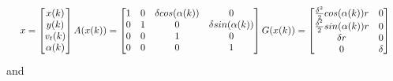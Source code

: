 \documentclass[twocolumn]{article}
\begin{document}
\begin{equation*}
    \resizebox{.99\columnwidth}{!}{ $ x=\begin{bmatrix} x(k) \\ y(k) \\ v_{t}(k) \\ \alpha(k) \\ \end{bmatrix}
            A(x(k))=\begin{bmatrix}
                1 & 0 & \delta cos(\alpha (k)) & 0                            \\
                0 & 1 & 0                            & \delta sin(\alpha (k)) \\
                0 & 0 & 1                            & 0                            \\
                0 & 0 & 0                            & 1                            \\
            \end{bmatrix}
            G(x(k))=\begin{bmatrix}
                \frac{\delta^{2}}{2} cos(\alpha (k))r & 0      \\
                \frac{\delta^{2}}{2} sin(\alpha (k))r & 0      \\
                \delta r                              & 0      \\
                0                                     & \delta \\
            \end{bmatrix}
        $ } \end{equation*}
and
\end{document}
